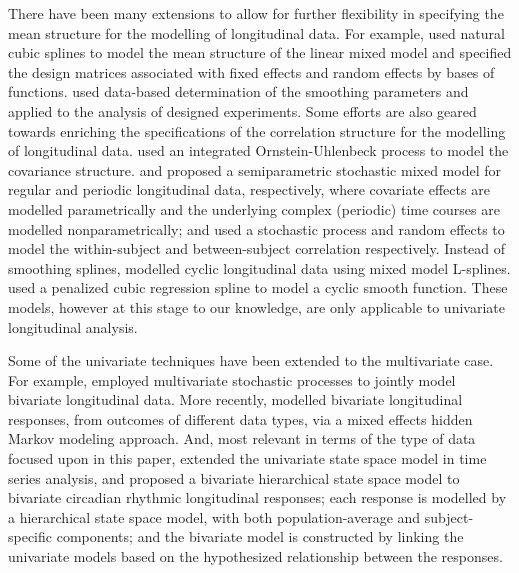 \documentclass[review]{elsarticle}
\begin{document}
There have  been many extensions to allow for further flexibility in specifying the mean structure for  the modelling of  longitudinal data.  For example, 
\citet{Brumback:1998} used natural cubic splines to model the mean structure of the linear mixed model
and specified the design matrices associated with fixed effects and random effects by bases of functions.
\citet{Verb:Cull:Kenw:Welh:quan:1999} 
used data-based determination of the smoothing parameters and applied to the analysis of designed experiments. 
Some efforts are also geared towards enriching the specifications of the correlation structure for the modelling of longitudinal data.
\citet{Tayl:Cumb:Sy:quan:1994} used an integrated Ornstein-Uhlenbeck process to model the covariance structure.
 \cite {Zhang:1998} and \citet{Zhan:Lin:Sowe:quan:2000}  proposed a  semiparametric stochastic mixed model for regular and periodic longitudinal data, respectively, where   covariate effects are modelled parametrically and the underlying complex (periodic) time courses are modelled nonparametrically; and used a stochastic process and random effects to model the within-subject and between-subject correlation respectively. 
Instead of  smoothing splines, \cite{Welh:Cull:Kenw:Thom:quan:2006} modelled cyclic longitudinal data using mixed model L-splines. 
\citet{Wood:2006} used a penalized cubic regression spline to model a cyclic smooth function. 
These models, however at this stage to our knowledge, are only applicable to univariate longitudinal analysis.


Some of the univariate techniques have been extended to the multivariate case.
For example, 
\citet{Sy:Cumb:Tayl:quan:1997} employed multivariate stochastic processes to jointly model  bivariate longitudinal data. 
 More recently, \cite{Raffa:2015} modelled bivariate longitudinal responses, from outcomes of different data types, via a mixed effects hidden Markov modeling approach.  And, most relevant in terms of the type of data focused upon in this paper,  \cite{Liu:Capp:Crof:Guo:quan:2014} extended the univariate state space model in time series analysis, and proposed a bivariate hierarchical state space model to bivariate circadian rhythmic  longitudinal responses;
each response is modelled by a hierarchical state space model, with both population-average and subject-specific components; and the bivariate model is constructed by linking the univariate models based on the hypothesized relationship between the responses. 
\end{document}
